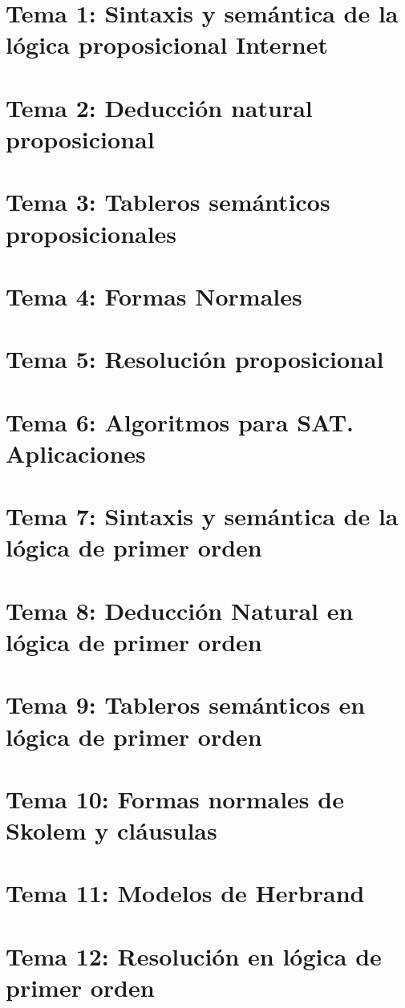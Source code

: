 \renewcommand{\contentsname}{Indice}
\tableofcontents
\newpage
\section{Tema 1: Sintaxis y semántica de la lógica proposicional Internet}

\newpage
\section{Tema 2: Deducción natural proposicional}

\newpage
\section{Tema 3: Tableros semánticos proposicionales}

\newpage
\section{Tema 4: Formas Normales}

\newpage
\section{Tema 5: Resolución proposicional}

\newpage
\section{Tema 6: Algoritmos para SAT. Aplicaciones}

\newpage
\section{Tema 7: Sintaxis y semántica de la lógica de primer orden}

\newpage
\section{Tema 8: Deducción Natural en lógica de primer orden}

\newpage
\section{Tema 9: Tableros semánticos en lógica de primer orden}

\newpage
\section{Tema 10: Formas normales de Skolem y cláusulas}

\newpage
\section{Tema 11: Modelos de Herbrand}

\newpage
\section{Tema 12: Resolución en lógica de primer orden}

\newpage